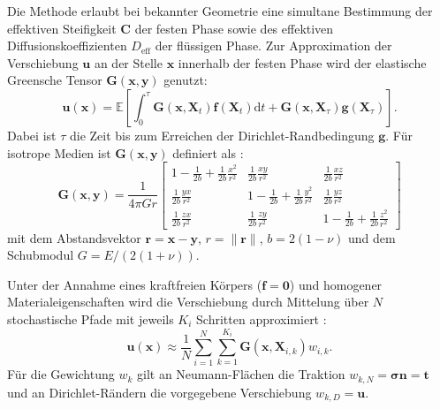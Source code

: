 Die Methode erlaubt bei bekannter Geometrie eine simultane Bestimmung der effektiven Steifigkeit $\boldsymbol{C}$ der festen Phase sowie des effektiven Diffusionskoeffizienten $D_{\text{eff}}$ der flüssigen Phase. Zur Approximation der Verschiebung $\boldsymbol{u}$ an der Stelle $\boldsymbol{x}$ innerhalb der festen Phase wird der elastische Greensche Tensor $\boldsymbol{G}(\boldsymbol{x}, \boldsymbol{y})$ genutzt:
\begin{equation}
    \boldsymbol{u}(\boldsymbol{x}) = \mathbb{E} \left[ \int_{0}^{\tau} \boldsymbol{G}(\boldsymbol{x},\boldsymbol{X}_t) \boldsymbol{f}(\boldsymbol{X}_t) \text{d}t + \boldsymbol{G}(\boldsymbol{x},\boldsymbol{X}_{\tau}) \boldsymbol{g}(\boldsymbol{X}_{\tau}) \right].
\end{equation}
Dabei ist $\tau$ die Zeit bis zum Erreichen der Dirichlet-Randbedingung $\boldsymbol{g}$. Für isotrope Medien ist $\boldsymbol{G}(\boldsymbol{x}, \boldsymbol{y})$ definiert als \cite{Lazar2014, Chen2022b}:
\begin{equation}
    \boldsymbol{G}(\boldsymbol{x}, \boldsymbol{y}) = \frac{1}{4\pi G r} \begin{bmatrix}
        1-\frac {1}{2b}+\frac {1}{2b}\frac {x^2}{r^2} & {\frac {1}{2b}}{\frac {xy}{r^{2}}} & {\frac {1}{2b}}{\frac {xz}{r^{2}}}\\
        {\frac {1}{2b}}{\frac {yx}{r^{2}}} & 1-{\frac {1}{2b}}+{\frac {1}{2b}}{\frac {y^{2}}{r^{2}}} & {\frac {1}{2b}}{\frac {yz}{r^{2}}}\\
        {\frac {1}{2b}}{\frac {zx}{r^{2}}} & {\frac {1}{2b}}{\frac {zy}{r^{2}}} & 1-{\frac {1}{2b}}+{\frac {1}{2b}}{\frac {z^{2}}{r^{2}}}
    \end{bmatrix}
\end{equation}
mit dem Abstandsvektor $\boldsymbol{r} = \boldsymbol{x} - \boldsymbol{y}$, $r = \lVert \boldsymbol{r} \rVert$, $b = 2(1-\nu)$ und dem Schubmodul $G = E / (2(1+\nu))$.

Unter der Annahme eines kraftfreien Körpers ($\boldsymbol{f}=\boldsymbol{0}$) und homogener Materialeigenschaften wird die Verschiebung durch Mittelung über $N$ stochastische Pfade mit jeweils $K_i$ Schritten approximiert \cite{Chen2024b}:
\begin{equation}
    \boldsymbol{u}(\boldsymbol{x}) \approx \frac{1}{N} \sum_{i=1}^{N} \sum_{k=1}^{K_i} \boldsymbol{G}(\boldsymbol{x}, \boldsymbol{X}_{i,k}) w_{i,k}.
\end{equation}
Für die Gewichtung $w_{k}$ gilt an Neumann-Flächen die Traktion $w_{k,N} = \boldsymbol{\sigma} \boldsymbol{n} = \boldsymbol{t}$ und an Dirichlet-Rändern die vorgegebene Verschiebung $w_{k,D} = \boldsymbol{u}$.

